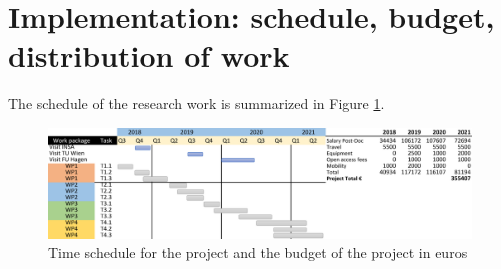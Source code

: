 \documentclass{article}
\begin{document}
\section{Implementation: schedule, budget, distribution of work}
The schedule of the research work is summarized in Figure \ref{fig:schedule}.
\begin{figure}[h]
	\centering
	\includegraphics[scale=0.7]{fig/schedule.png}
	\caption{Time schedule for the project and the budget of the project in euros}
	\label{fig:schedule}
\end{figure}
\end{document}
